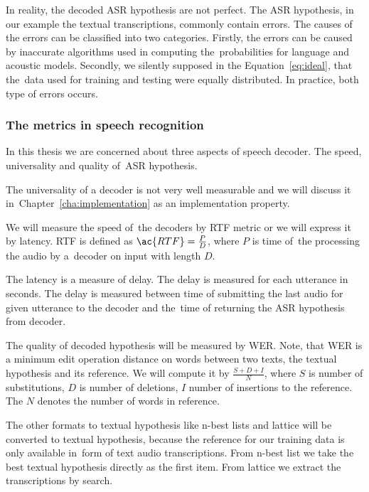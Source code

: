 In reality, the decoded ASR hypothesis are not perfect. The ASR hypothesis, in our example the textual transcriptions, 
commonly contain errors. The causes of the errors can be classified into two categories. 
Firstly, the errors can be caused by inaccurate algorithms used in computing 
the~probabilities for language and acoustic models. Secondly, we silently supposed in the Equation~\ref{eq:ideal}, 
that the~data used for training and testing were equally distributed. 
In practice, both type of errors occurs.

\subsubsection*{The metrics in speech recognition}
\label{sub:the_metrics_in_speech_recognition}
In this thesis we are concerned about three aspects of speech decoder.
The speed, universality and quality of~\ac{ASR} hypothesis.

The universality of a decoder is not very well measurable and we will discuss it 
in~Chapter~\ref{cha:implementation} as an implementation property.

We will measure the speed of~the decoders by \acl{RTF} metric or we will express it by latency.
\ac{RTF} is defined as $\ac{RTF} = \frac{P}{D}$, where $P$ is time of~the processing the audio by a~decoder on input with length $D$. 

The latency is a measure of delay. The delay is measured for each utterance in seconds. 
The delay is measured between time of submitting the last audio for given utterance to the decoder and 
the~time of returning the \ac{ASR} hypothesis from decoder.

The quality of decoded hypothesis will be measured by \ac{WER}.
Note, that \ac{WER} is a minimum edit operation distance on words between two texts, the textual hypothesis
and its reference.
We will compute it by $\frac{S+D+I}{N}$, where $S$ is number of substitutions,
$D$ is number of deletions, $I$ number of insertions to the reference. 
The $N$ denotes the number of words in reference. 

The other formats to textual hypothesis like n-best lists and lattice
will be converted to textual hypothesis, because the reference for our training data is only available  
in~form of text audio transcriptions.
From n-best list we take the best textual hypothesis directly as the first item. From lattice
we extract the transcriptions by search.  

